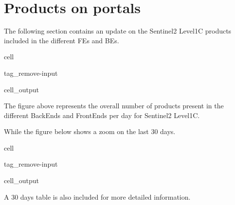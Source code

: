 \documentclass[letterpaper,10pt,english]{jupyterBook}
\begin{document}
\section{Products on portals}
\label{\detokenize{S2L1C_portals:products-on-portals}}
\sphinxAtStartPar
The following section contains an update on the Sentinel\sphinxhyphen{}2 Level\sphinxhyphen{}1C products included in the different FEs and BEs.

\begin{sphinxuseclass}{cell}
\begin{sphinxuseclass}{tag_remove-input}\begin{sphinxVerbatimOutput}

\begin{sphinxuseclass}{cell_output}
\noindent{}

\end{sphinxuseclass}\end{sphinxVerbatimOutput}

\end{sphinxuseclass}
\end{sphinxuseclass}
\sphinxAtStartPar
The figure above represents the overall number of products present in the different BackEnds and FrontEnds per day for Sentinel\sphinxhyphen{}2 Level\sphinxhyphen{}1C.

\sphinxAtStartPar
While the figure below shows a zoom on the last 30 days.

\begin{sphinxuseclass}{cell}
\begin{sphinxuseclass}{tag_remove-input}\begin{sphinxVerbatimOutput}

\begin{sphinxuseclass}{cell_output}
\noindent{}

\end{sphinxuseclass}\end{sphinxVerbatimOutput}

\end{sphinxuseclass}
\end{sphinxuseclass}
\sphinxAtStartPar
A 30 days table is also included for more detailed information.
\end{document}
